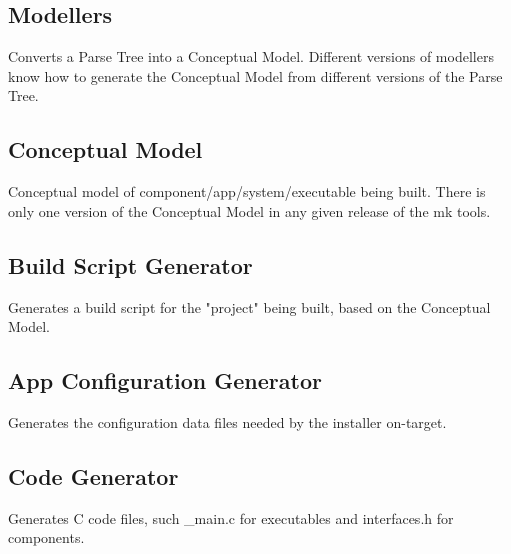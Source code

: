 \hypertarget{mkToolsDesign_mkToolsDesign_modellers}{}\subsection{Modellers}\label{mkToolsDesign_mkToolsDesign_modellers}
\begin{DoxyVerb}Converts a Parse Tree into a Conceptual Model.
Different versions of modellers know how to generate the Conceptual Model from different
versions of the Parse Tree.
\end{DoxyVerb}
\hypertarget{mkToolsDesign_mkToolsDesign_conceptualModel}{}\subsection{Conceptual Model}\label{mkToolsDesign_mkToolsDesign_conceptualModel}
\begin{DoxyVerb}Conceptual model of component/app/system/executable being built.
There is only one version of the Conceptual Model in any given release of the mk tools.
\end{DoxyVerb}
\hypertarget{mkToolsDesign_mkToolsDesign_buildScriptGenerator}{}\subsection{Build Script Generator}\label{mkToolsDesign_mkToolsDesign_buildScriptGenerator}
\begin{DoxyVerb}Generates a build script for the "project" being built, based on the Conceptual Model.
\end{DoxyVerb}
\hypertarget{mkToolsDesign_mkToolsDesign_appConfigGenerator}{}\subsection{App Configuration Generator}\label{mkToolsDesign_mkToolsDesign_appConfigGenerator}
\begin{DoxyVerb}Generates the configuration data files needed by the installer on-target.
\end{DoxyVerb}
\hypertarget{mkToolsDesign_mkToolsDesign_codeGenerator}{}\subsection{Code Generator}\label{mkToolsDesign_mkToolsDesign_codeGenerator}
\begin{DoxyVerb}Generates C code files, such _main.c for executables and interfaces.h for components.
\end{DoxyVerb}
